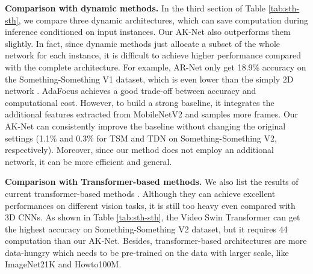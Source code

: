 \documentclass[journal]{IEEEtran}
\begin{document}
\textbf{Comparison with dynamic methods.}
In the third section of Table \ref{tab:sth-sth}, we compare three dynamic architectures, which can save computation during inference conditioned on input instances.
Our AK-Net also outperforms them slightly.
In fact, since dynamic methods just allocate a subset of the whole network for each instance, it is difficult to achieve higher performance compared with the complete architecture.
For example, AR-Net \cite{meng2020ar} only get 18.9\% accuracy on the Something-Something V1 dataset, which is even lower than the simply 2D network \cite{wang2016temporal}.
AdaFocus \cite{Wang_2021_AdaFocus} achieves a good trade-off between accuracy and computational cost.
However, to build a strong baseline, it integrates the additional features extracted from MobileNetV2 \cite{sandler2018mobilenetv2} and samples more frames.
Our AK-Net can consistently improve the baseline without changing the original settings (1.1\% and 0.3\% for TSM and TDN on Something-Something V2, respectively).
Moreover, since our method does not employ an additional network, it can be more efficient and general.

\textbf{Comparison with Transformer-based methods.}
We also list the results of current transformer-based methods \cite{bertasius2021space, liu2021video}.
Although they can achieve excellent performances on different vision tasks, it is still too heavy even compared with 3D CNNs.
As shown in Table \ref{tab:sth-sth}, the Video Swin Transformer \cite{liu2021video} can get the highest accuracy on Something-Something V2 dataset, but it requires 44 computation than our AK-Net.
Besides, transformer-based architectures are more data-hungry which needs to be pre-trained on the data with larger scale, like ImageNet21K and Howto100M.
\end{document}
